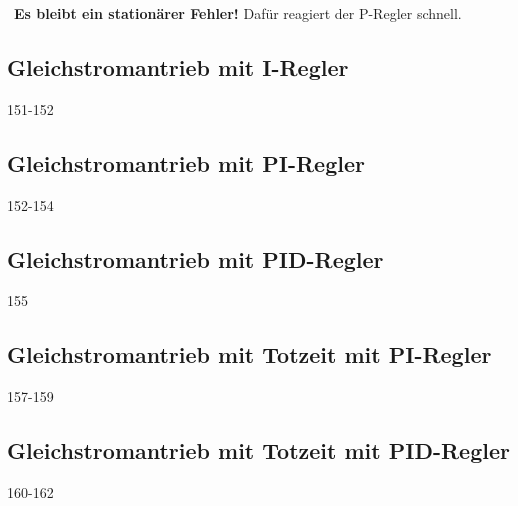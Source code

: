 \textrightarrow\ \textbf{Es bleibt ein stationärer Fehler!} Dafür reagiert der P-Regler schnell.


\subsection{Gleichstromantrieb mit I-Regler}{151-152}


\subsection{Gleichstromantrieb mit PI-Regler}{152-154}


\subsection{Gleichstromantrieb mit PID-Regler}{155}


\subsection{Gleichstromantrieb mit Totzeit mit PI-Regler}{157-159}


\subsection{Gleichstromantrieb mit Totzeit mit PID-Regler}{160-162}